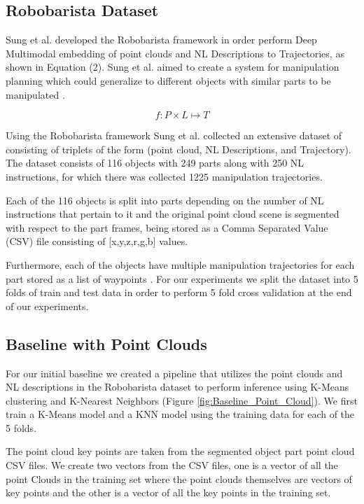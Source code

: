 \documentclass[letterpaper, 12 pt, conference]{ieeeconf}
\begin{document}
\subsection{Robobarista Dataset}

Sung et al. developed the Robobarista framework in order perform Deep Multimodal embedding of point clouds and NL Descriptions to Trajectories, as shown in Equation (2). Sung et al. aimed to create a system for manipulation planning which could generalize to different objects with similar parts to be manipulated \cite{sung2016robobarista}. 

\begin{equation}
f: P\times L \mapsto T
\end{equation}

Using the Robobarista framework Sung et al. collected an extensive dataset of consisting of triplets of the form (point cloud, NL Descriptions, and Trajectory). The dataset consists of 116 objects with 249 parts along with 250 NL instructions, for which there was collected 1225 manipulation trajectories. 

Each of the 116 objects is split into parts depending on the number of NL instructions that pertain to it and the original point cloud scene is segmented with respect to the part frames, being stored as a Comma Separated Value (CSV) file consisting of [x,y,z,r,g,b] values. 

Furthermore, each of the objects have multiple manipulation trajectories for each part stored as a list of waypoints \cite{sung2016robobarista}. For our experiments we split the dataset into 5 folds of train and test data in order to perform 5 fold cross validation at the end of our experiments.

\subsection{Baseline with Point Clouds}
For our initial baseline we created a pipeline that utilizes the point clouds and NL descriptions in the Robobarista dataset to perform inference using K-Means clustering and K-Nearest Neighbors (Figure \ref{fig:Baseline_Point_Cloud}). We first train a K-Means model and a KNN model using the training data for each of the 5 folds.

The point cloud key points are taken from the segmented object part point cloud CSV files. We create two vectors from the CSV files, one is a vector of all the point Clouds in the training set where the point clouds themselves are vectors of key points and the other is a vector of all the key points in the training set. 
\end{document}
